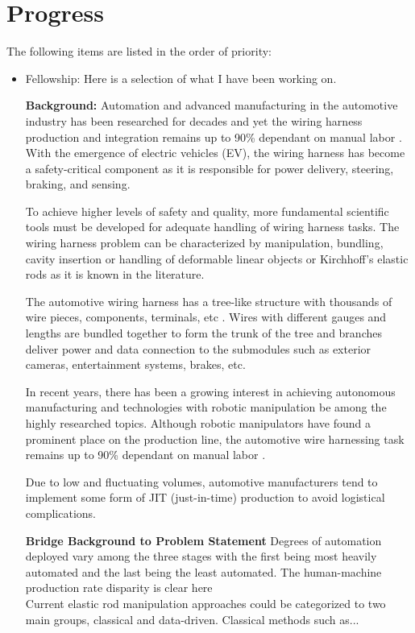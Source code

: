 \documentclass[11pt]{article}
\begin{document}
\section{Progress}
The following items are listed in the order of priority:
\begin{itemize}
      \item Fellowship: Here is a selection of what I have been working on.

      \textbf{Background:} Automation and advanced manufacturing in the automotive
      industry has been researched for decades and yet the wiring harness production
      and integration remains up to 90\% dependant on manual labor \cite{nguyen2021manufacturing}.
      With the emergence of electric vehicles (EV), the wiring harness has become
      a safety-critical component as it is responsible for power delivery, steering,
      braking, and sensing.

      To achieve higher levels of safety and quality,
      more fundamental scientific tools must be developed for adequate handling of wiring harness tasks.
      The wiring harness problem can be characterized by manipulation,
      bundling, cavity insertion or handling of deformable linear objects or Kirchhoff's elastic rods as it is known in the literature.

      The automotive wiring harness has a tree-like structure with thousands of wire pieces, components, terminals, etc \cite{Log-linearLearnMan}.
      Wires with different gauges and lengths are bundled together to form the trunk of the tree and branches deliver power and data connection to the submodules such as exterior cameras, entertainment systems, brakes, etc.

      In recent years, there has been a growing interest in achieving autonomous manufacturing and technologies with robotic manipulation be among the highly researched topics. Although robotic manipulators have found a prominent place on the production line, the automotive wire harnessing task remains up to 90\% dependant on manual labor \cite{nguyen2021manufacturing}.

      Due to low and fluctuating volumes, automotive manufacturers tend to implement some form of JIT (just-in-time) production to avoid logistical complications.

      \noindent
      \textbf{Bridge Background to Problem Statement}
      Degrees of automation deployed vary among the three stages with the first being most heavily automated and the last being the least automated. The human-machine production rate disparity is clear here\\
      Current elastic rod manipulation approaches could be categorized to two main groups, classical and data-driven. Classical methods such as...\\


\end{itemize}
\end{document}
